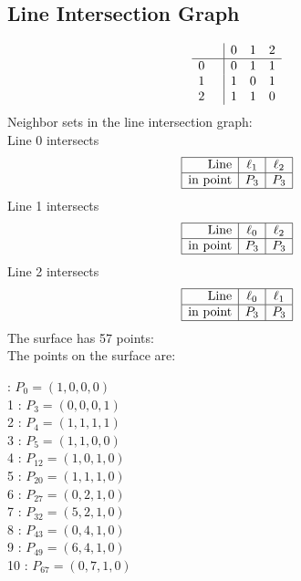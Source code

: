 \documentclass{article}
\begin{document}
{\subsection*{Line Intersection Graph}
{\arraycolsep=1pt
$$
\begin{array}{rr|*{3}r}
 &  & 0 & 1 & 2\\
\hline
0 &  & 0 & 1 & 1\\
1 &  & 1 & 0 & 1\\
2 &  & 1 & 1 & 0\\
\end{array}
$$
}%
Neighbor sets in the line intersection graph:\\
Line 0 intersects 
$$
\begin{array}{|r*{2}{|c}|}
\hline
\mbox{Line}  & \ell_{1} & \ell_{2}\\
\hline
\mbox{in point}  & P_{3} & P_{3}\\
\hline
\end{array}
$$
Line 1 intersects 
$$
\begin{array}{|r*{2}{|c}|}
\hline
\mbox{Line}  & \ell_{0} & \ell_{2}\\
\hline
\mbox{in point}  & P_{3} & P_{3}\\
\hline
\end{array}
$$
Line 2 intersects 
$$
\begin{array}{|r*{2}{|c}|}
\hline
\mbox{Line}  & \ell_{0} & \ell_{1}\\
\hline
\mbox{in point}  & P_{3} & P_{3}\\
\hline
\end{array}
$$
The surface has 57 points:\\
The points on the surface are:\\
\begin{multicols}{3}
 : $P_{0}=( 1, 0, 0, 0 )$\\
1 : $P_{3}=( 0, 0, 0, 1 )$\\
2 : $P_{4}=( 1, 1, 1, 1 )$\\
3 : $P_{5}=( 1, 1, 0, 0 )$\\
4 : $P_{12}=( 1, 0, 1, 0 )$\\
5 : $P_{20}=( 1, 1, 1, 0 )$\\
6 : $P_{27}=( 0, 2, 1, 0 )$\\
7 : $P_{32}=( 5, 2, 1, 0 )$\\
8 : $P_{43}=( 0, 4, 1, 0 )$\\
9 : $P_{49}=( 6, 4, 1, 0 )$\\
10 : $P_{67}=( 0, 7, 1, 0 )$\\

\end{multicols}}
\end{document}
